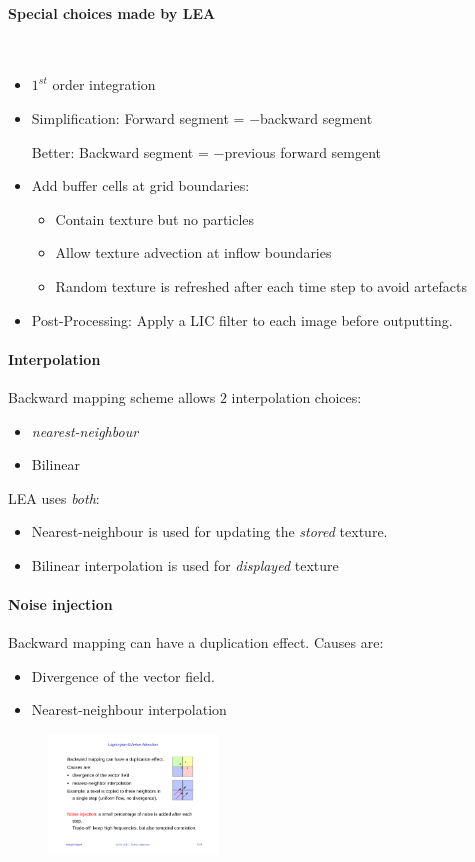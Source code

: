 \paragraph{Special choices made by LEA} $\ $ 
\begin{itemize}
    \item $1^{st}$ order integration
    \item Simplification: Forward segment = $-$backward segment
    
        Better: Backward segment = $-$previous forward semgent
    \item Add buffer cells at grid boundaries:
        \begin{itemize}
            \item Contain texture but no particles
            \item Allow texture advection at inflow boundaries
            \item Random texture is refreshed after each time step to avoid artefacts
        \end{itemize}
    \item Post-Processing: Apply a LIC filter to each image before outputting.
\end{itemize}
\paragraph{Interpolation}
Backward mapping scheme allows $2$ interpolation choices:
\begin{itemize}
    \item \emph{nearest-neighbour}
    \item Bilinear
\end{itemize}
LEA uses \emph{both}:
\begin{itemize}
    \item Nearest-neighbour is used for updating the \emph{stored} texture.
    \item Bilinear interpolation is used for \emph{displayed} texture
\end{itemize}

\paragraph{Noise injection} Backward mapping can have a duplication effect. Causes are:
\begin{itemize}
    \item Divergence of the vector field.
    \item Nearest-neighbour interpolation
\end{itemize}
\begin{figure}[H]
    \centering
    \includegraphics[width=0.4\textwidth]{img/06_noise_injection}
\end{figure}



